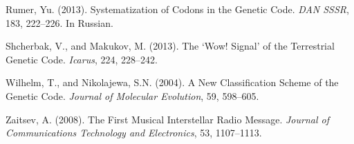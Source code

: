 \documentclass[12pt]{article}
\begin{document}
\begin{description}
\item Rumer, Yu. (2013). Systematization of Codons in the Genetic Code. \textit{DAN SSSR}, 183, 222--226. In Russian.
\item Shcherbak, V., and Makukov, M. (2013). The `Wow! Signal' of the Terrestrial Genetic Code. \textit{Icarus}, 224, 228--242.
\item Wilhelm, T., and Nikolajewa, S.N. (2004). A New Classification Scheme of the Genetic Code. \textit{Journal of Molecular Evolution}, 59, 598--605.
\item Zaitsev, A. (2008). The First Musical Interstellar Radio Message. \textit{Journal of Communications Technology and Electronics}, 53, 1107--1113.
\end{description}
\end{document}
